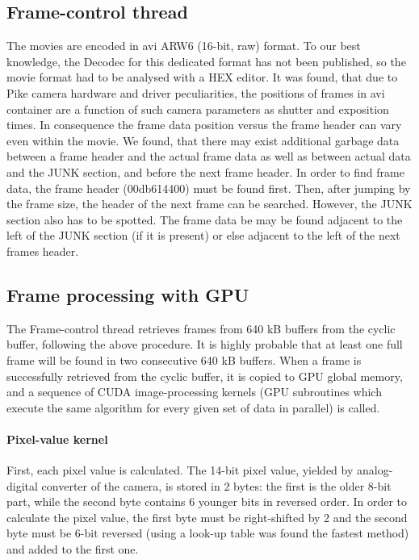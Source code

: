 \documentclass[12pt,dvips]{elsarticle}
\begin{document}
\subsection{Frame-control thread} The movies are encoded in avi ARW6 (16-bit, raw) format. To our best knowledge, the
Decodec for this dedicated format has not been published, so the movie format had to be analysed with a HEX editor. It was
found, that due to Pike camera hardware and driver peculiarities, the positions of frames in avi container are a function
of such camera parameters as shutter and exposition times. In consequence the frame data position versus the frame header
can vary even within the movie. We found, that there may exist additional garbage data between a frame header and the
actual frame data as well as between actual data and the JUNK section, and before the next frame header. In order to find
frame data, the frame header (00db614400) must be found first. Then, after jumping by the frame size, the header of the
next frame can be searched. However, the JUNK section also has to be spotted. The frame data be may be found adjacent to
the left of the JUNK section (if it is present) or else adjacent to the left of the next frames header.

\subsection{Frame processing with GPU} The Frame-control thread retrieves frames from 640 kB buffers from the cyclic
buffer, following the above procedure. It is highly probable that at least one full frame will be found in two consecutive
640 kB buffers. When a frame is successfully retrieved from the cyclic buffer, it is copied to GPU global memory, and a
sequence of CUDA image-processing kernels (GPU subroutines which execute the same algorithm for every given set of data in
parallel) is called.

\paragraph{Pixel-value kernel} First, each pixel value is calculated. The 14-bit pixel value, yielded by
analog-digital converter of the camera, is stored in 2 bytes: the first is the older 8-bit part, while the second byte
contains 6 younger bits in reversed order. In order to calculate the pixel value, the first byte must be right-shifted by
2 and the second byte must be 6-bit reversed (using a look-up table was found the fastest method) and added to the first
one.
\end{document}
